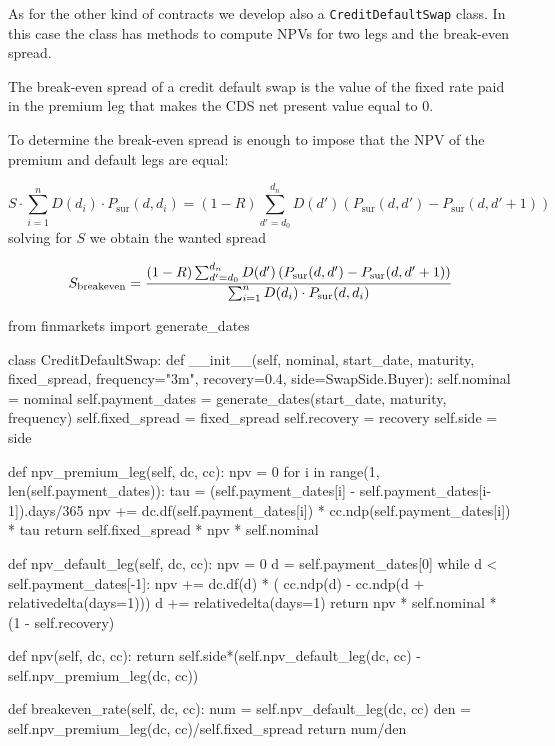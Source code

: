 \begin{finmarkets}
As for the other kind of contracts we develop also a \texttt{CreditDefaultSwap} class. In this case the class has methods to compute NPVs for two legs and the break-even spread.

The break-even spread of a credit default swap is the value of the fixed rate paid in the premium leg that makes the CDS net present value equal to 0.

To determine the break-even spread is enough to impose that the NPV of the premium and default legs are equal:

\begin{equation}
S \cdot\sum_{i=1}^{n} D(d_i) \cdot P_{\textrm{sur}}(d, d_i)
= (1-R) \sum_{d'=d_0}^{d_n} D(d') \left( P_{\textrm{sur}}(d, d') - P_{\textrm{sur}}(d, d'+1) \right)
\end{equation}
solving for $S$ we obtain the wanted spread

\begin{equation}
S_{\mathrm{breakeven}} = \cfrac{(1-R) \sum_{d'=d_0}^{d_n} D(d') \left( P_{\textrm{sur}}(d, d') - P_{\textrm{sur}}(d, d'+1) \right)}{\sum_{i=1}^{n} D(d_i) \cdot P_{\textrm{sur}}(d, d_i)}
\end{equation}
\end{finmarkets}

\begin{ipython}
from finmarkets import generate_dates

class CreditDefaultSwap:
    def __init__(self, nominal, start_date, maturity, fixed_spread,
                 frequency="3m", recovery=0.4, side=SwapSide.Buyer):
        self.nominal = nominal
        self.payment_dates = generate_dates(start_date, maturity, frequency)
        self.fixed_spread = fixed_spread
        self.recovery = recovery
        self.side = side

    def npv_premium_leg(self, dc, cc):
        npv = 0
        for i in range(1, len(self.payment_dates)):
            tau = (self.payment_dates[i] - self.payment_dates[i-1]).days/365
            npv += dc.df(self.payment_dates[i]) * cc.ndp(self.payment_dates[i]) * tau
        return self.fixed_spread * npv * self.nominal

    def npv_default_leg(self, dc, cc):
        npv = 0
        d = self.payment_dates[0]
        while d < self.payment_dates[-1]:
            npv += dc.df(d) * (
                   cc.ndp(d) -
                   cc.ndp(d + relativedelta(days=1)))
            d += relativedelta(days=1)
        return npv * self.nominal * (1 - self.recovery)

    def npv(self, dc, cc):
        return self.side*(self.npv_default_leg(dc, cc) - self.npv_premium_leg(dc, cc))

    def breakeven_rate(self, dc, cc):
        num = self.npv_default_leg(dc, cc)
        den = self.npv_premium_leg(dc, cc)/self.fixed_spread
        return num/den
\end{ipython}

